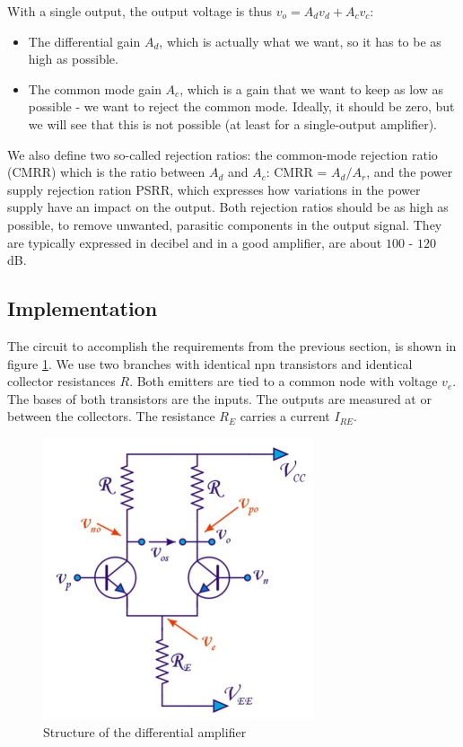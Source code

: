 With a single output, the output voltage is thus $v_o = A_d v_d + A_c v_c$:
\begin{itemize}
	\item The differential gain $A_d$, which is actually what we want, so it has to be as high as possible.
	\item The common mode gain $A_c$, which is a gain that we want to keep as low as possible - we want to reject the common mode. Ideally, it should be zero, but we will see that this is not possible (at least for a single-output amplifier).
\end{itemize}
We also define two so-called rejection ratios: the common-mode rejection ratio (CMRR) which is the ratio between $A_d$ and $A_c$: CMRR = $A_d/A_r$, and the power supply rejection ration PSRR, which expresses how variations in the power supply have an impact on the output. Both rejection ratios should be as high as possible, to remove unwanted, parasitic components in the output signal. They are typically expressed in decibel and in a good amplifier, are about $100$ - $120$ dB.\\
\subsection{Implementation}
The circuit to accomplish the requirements from the previous section, is shown in figure \ref{fig:diff_amp2}. We use two branches with identical npn transistors and identical collector resistances $R$. Both emitters are tied to a common node with voltage $v_e$. The bases of both transistors are the inputs. The outputs are measured at or between the collectors. The resistance $R_E$ carries a current $I_{RE}$.

\begin{figure}[h!]
	\centering
	\includegraphics[width=8cm]{figures/ch02/diff_amp2.jpg}
	\caption{Structure of the differential amplifier}
	\label{fig:diff_amp2}
\end{figure}

